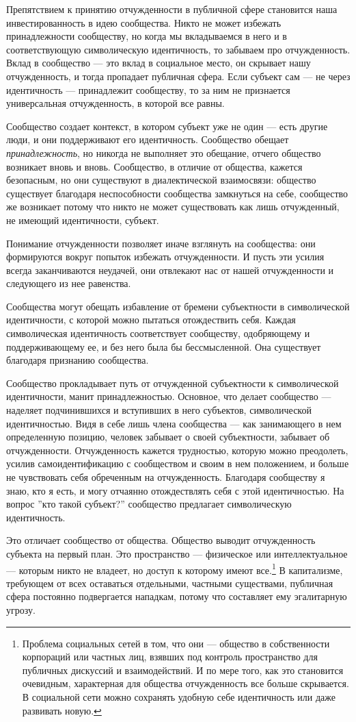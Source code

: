 \documentclass[12pt]{book}
\begin{document}
Препятствием к принятию отчужденности в публичной сфере становится наша инвестированность в идею сообщества. Никто не может избежать принадлежности сообществу, но когда мы вкладываемся в него и в соответствующую символическую идентичность, то забываем про отчужденность. Вклад в сообщество --- это вклад в социальное место, он скрывает нашу отчужденность, и тогда пропадает публичная сфера. Если субъект сам --- не через идентичность --- принадлежит сообществу, то за ним не признается универсальная отчужденность, в которой все равны.

Сообщество создает контекст, в котором субъект уже не один --- есть другие люди, и они поддерживают его идентичность. Сообщество обещает \textit{принадлежность}, но никогда не выполняет это обещание, отчего общество возникает вновь и вновь. Сообщество, в отличие от общества, кажется безопасным, но они существуют в диалектической взаимосвязи: общество существует благодаря неспособности сообщества замкнуться на себе, сообщество же возникает потому что никто не может существовать как лишь отчужденный, не имеющий идентичности, субъект.

Понимание отчужденности позволяет иначе взглянуть на сообщества: они формируются вокруг попыток избежать отчужденности. И пусть эти усилия всегда заканчиваются неудачей, они отвлекают нас от нашей отчужденности и следующего из нее равенства.

Сообщества могут обещать избавление от бремени субъектности в символической идентичности, с которой можно пытаться отождествить себя. Каждая символическая идентичность соответствует сообществу, одобряющему и поддерживающему ее, и без него была бы бессмысленной. Она существует благодаря признанию сообщества.

Сообщество прокладывает путь от отчужденной субъектности к символической идентичности, манит принадлежностью. Основное, что делает сообщество --- наделяет подчинившихся и вступивших в него субъектов, символической идентичностью. Видя в себе лишь члена сообщества --- как занимающего в нем определенную позицию, человек забывает о своей субъектности, забывает об отчужденности. Отчужденность кажется трудностью, которую можно преодолеть, усилив самоидентификацию с сообществом и своим в нем положением, и больше не чувствовать себя обреченным на отчужденность. Благодаря сообществу я знаю, кто я есть, и могу отчаянно отождествлять себя с этой идентичностью. На вопрос ''кто такой субъект?'' сообщество предлагает символическую идентичность.

Это отличает сообщество от общества. Общество выводит отчужденность субъекта на первый план. Это пространство --- физическое или интеллектуальное --- которым никто не владеет, но доступ к которому имеют все.\footnote{Проблема социальных сетей в том, что они --- общество в собственности корпораций или частных лиц, взявших под контроль пространство для публичных дискуссий и взаимодействий. И по мере того, как это становится очевидным, характерная для общества отчужденность все больше скрывается. В социальной сети можно сохранять удобную себе идентичность или даже развивать новую.} В капитализме, требующем от всех оставаться отдельными, частными существами, публичная сфера постоянно подвергается нападкам, потому что составляет ему эгалитарную угрозу.
\end{document}

